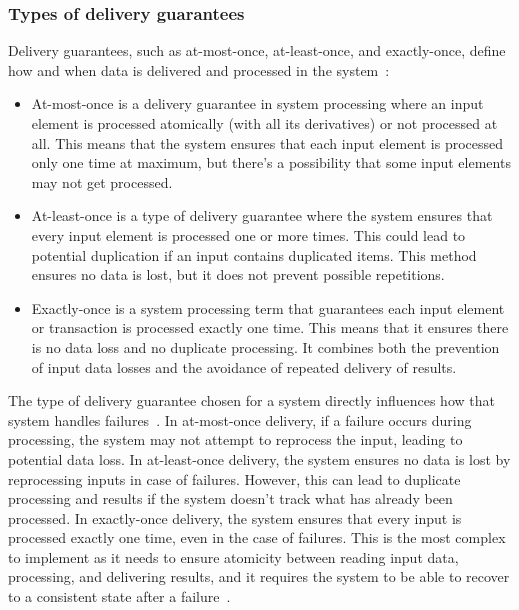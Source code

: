 \subsubsection{Types of delivery guarantees}

Delivery guarantees, such as at-most-once, at-least-once, and exactly-once, define how and when data is delivered and processed in the system~\cite{fragkoulis2024survey, carbone2018scalable, Akidau:2013:MFS:2536222.2536229}:
\begin{itemize}
    \item At-most-once is a delivery guarantee in system processing where an input element is processed atomically (with all its derivatives) or not processed at all. This means that the system ensures that each input element is processed only one time at maximum, but there's a possibility that some input elements may not get processed.
    \item At-least-once is a type of delivery guarantee where the system ensures that every input element is processed one or more times. This could lead to potential duplication if an input contains duplicated items. This method ensures no data is lost, but it does not prevent possible repetitions.
    \item Exactly-once is a system processing term that guarantees each input element or transaction is processed exactly one time. This means that it ensures there is no data loss and no duplicate processing. It combines both the prevention of input data losses and the avoidance of repeated delivery of results.
\end{itemize}

The type of delivery guarantee chosen for a system directly influences how that system handles failures~\cite{zhang2024survey, silvestre2021clonos, wang2021consistency}. In at-most-once delivery, if a failure occurs during processing, the system may not attempt to reprocess the input, leading to potential data loss. In at-least-once delivery, the system ensures no data is lost by reprocessing inputs in case of failures. However, this can lead to duplicate processing and results if the system doesn't track what has already been processed. In exactly-once delivery, the system ensures that every input is processed exactly one time, even in the case of failures. This is the most complex to implement as it needs to ensure atomicity between reading input data, processing, and delivering results, and it requires the system to be able to recover to a consistent state after a failure~\cite{Carbone:2017:SMA:3137765.3137777}.

